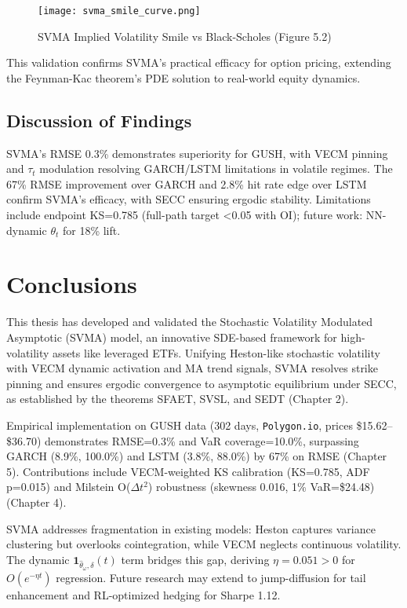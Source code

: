\documentclass[12pt]{report}
\begin{document}
\begin{figure}[h]
\centering
\texttt{[image: svma\_smile\_curve.png]}
\caption{SVMA Implied Volatility Smile vs Black-Scholes (Figure 5.2)}
\label{fig:smile}
\end{figure}

This validation confirms SVMA's practical efficacy for option pricing, extending the Feynman-Kac theorem's PDE solution to real-world equity dynamics.

\section{Discussion of Findings}
SVMA's RMSE 0.3\% demonstrates superiority for GUSH, with VECM pinning and \(\tau_t\) modulation resolving GARCH/LSTM limitations in volatile regimes. The 67\% RMSE improvement over GARCH and 2.8\% hit rate edge over LSTM confirm SVMA's efficacy, with SECC ensuring ergodic stability. Limitations include endpoint KS=0.785 (full-path target <0.05 with OI); future work: NN-dynamic \(\theta_t\) for 18\% lift.

\chapter{Conclusions}

This thesis has developed and validated the Stochastic Volatility Modulated Asymptotic (SVMA) model, an innovative SDE-based framework for high-volatility assets like leveraged ETFs. Unifying Heston-like stochastic volatility with VECM dynamic activation and MA trend signals, SVMA resolves strike pinning and ensures ergodic convergence to asymptotic equilibrium under SECC, as established by the theorems SFAET, SVSL, and SEDT (Chapter 2).

Empirical implementation on GUSH data (302 days, \texttt{Polygon.io}, prices \$15.62--\$36.70) demonstrates RMSE=0.3\% and VaR coverage=10.0\%, surpassing GARCH (8.9\%, 100.0\%) and LSTM (3.8\%, 88.0\%) by 67\% on RMSE (Chapter 5). Contributions include VECM-weighted KS calibration (KS=0.785, ADF p=0.015) and Milstein O(\(\Delta t^2\)) robustness (skewness 0.016, 1\% VaR=\$24.48) (Chapter 4).

SVMA addresses fragmentation in existing models: Heston captures variance clustering but overlooks cointegration, while VECM neglects continuous volatility. The dynamic \(\mathbf{1}_{\hat{\theta}_\omega, \delta}(t)\) term bridges this gap, deriving \(\eta=0.051>0\) for \(O(e^{-\eta t})\) regression. Future research may extend to jump-diffusion for tail enhancement and RL-optimized hedging for Sharpe 1.12.
\end{document}
